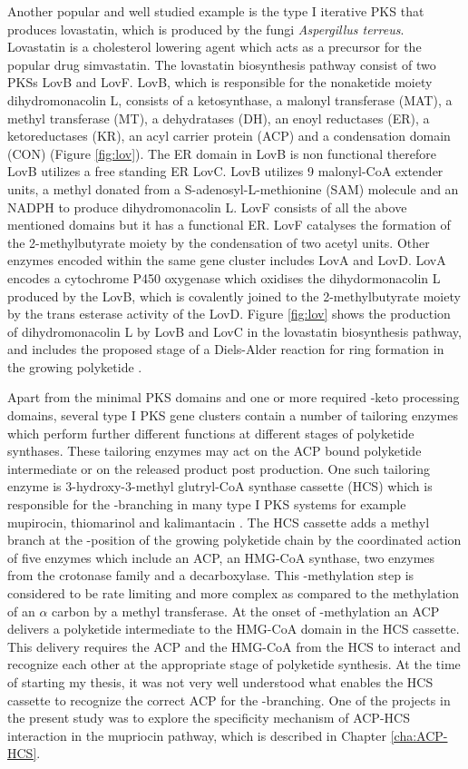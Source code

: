 			Another popular and well studied example is the type I iterative PKS that produces lovastatin, which is produced by the fungi \textit{Aspergillus terreus}. Lovastatin is a cholesterol lowering agent which acts as a precursor for the popular drug simvastatin. The lovastatin biosynthesis pathway consist of two PKSs LovB and LovF. LovB, which is responsible for the nonaketide moiety dihydromonacolin L, consists of a ketosynthase, a malonyl transferase (MAT), a methyl transferase (MT), a dehydratases (DH), an enoyl reductases (ER), a ketoreductases (KR), an acyl carrier protein (ACP) and a condensation domain (CON) (Figure \ref{fig:lov}). The ER domain in LovB is non functional therefore LovB utilizes a free standing ER LovC. LovB utilizes 9 malonyl-CoA extender units, a methyl donated from a S-adenosyl-L-methionine (SAM) molecule and an NADPH to produce dihydromonacolin L. LovF consists of all the above mentioned domains but it has a functional ER. LovF catalyses the formation of the 2-methylbutyrate moiety by the condensation of two acetyl units. Other enzymes encoded within the same gene cluster includes LovA and LovD. LovA encodes a cytochrome P450 oxygenase which oxidises the dihydormonacolin L produced by the LovB, which is covalently joined to the 2-methylbutyrate moiety by the trans esterase activity of the LovD. Figure \ref{fig:lov} shows the production of dihydromonacolin L by LovB and LovC in the lovastatin biosynthesis pathway, and includes  the proposed stage of a Diels-Alder reaction for ring formation in the growing polyketide \parencite{Kennedy1999,Ma2007, Campbell2010, Ames2012}. 
			
			Apart from the minimal PKS domains and one or more required \bet-keto processing domains, several type I PKS gene clusters contain a number of tailoring enzymes which perform further different functions at different stages of polyketide synthases. These tailoring enzymes may act on the ACP bound polyketide intermediate or on the released product post production. One such tailoring enzyme is 3-hydroxy-3-methyl glutryl-CoA synthase cassette (HCS) which is responsible for the \bet-branching in many type I PKS systems for example mupirocin, thiomarinol and kalimantacin \parencite{Haines2013}. The HCS cassette adds a methyl branch at the \bet-position of the growing polyketide chain by the coordinated action of five enzymes which include an ACP, an HMG-CoA synthase, two enzymes from the crotonase family and a decarboxylase. This \bet-methylation step is considered to be rate limiting and more complex as compared to the methylation of an $\alpha$ carbon by a methyl transferase. At the onset of \bet-methylation an ACP delivers a polyketide intermediate to the HMG-CoA domain in the HCS cassette. This delivery requires the ACP and the HMG-CoA from the HCS to interact and recognize each other at the appropriate stage of polyketide synthesis. At the time of starting my thesis, it was not very well understood what enables the HCS cassette to recognize the correct ACP for the \bet-branching. One of the projects in the present study was to explore the specificity mechanism of ACP-HCS interaction in the mupriocin pathway, which is described in Chapter \ref{cha:ACP-HCS}.
			
